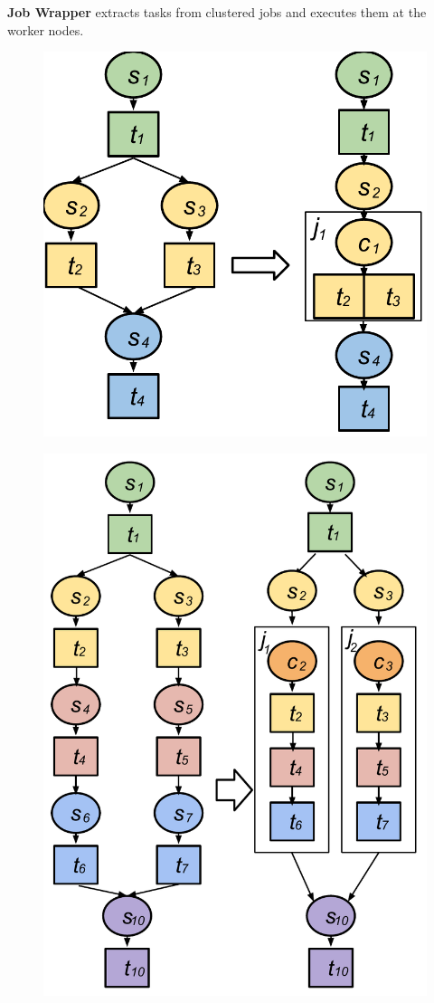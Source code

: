 \textbf{Job Wrapper} extracts tasks from clustered jobs and executes them at the worker nodes. 


\begin{figure}[h!]
\centering
 \includegraphics[width=0.5\linewidth]{figures/introduction/hc.pdf}
  \label{fig:intro_hc}
\end{figure}


\begin{figure}[!htb]
\centering
 \includegraphics[width=0.5\linewidth]{figures/model/vc.pdf}
  \label{fig:model_vc}
\end{figure}


